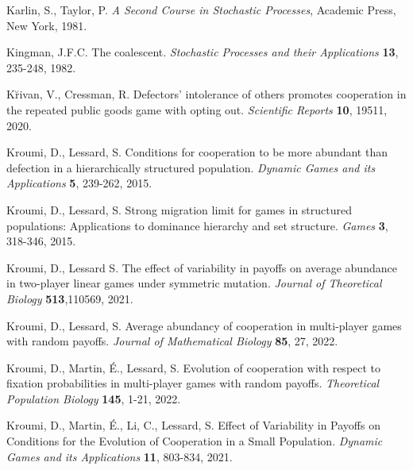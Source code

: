 \documentclass[11pt]{article}
\begin{document}
\begin{thebibliography}{99}
%
%
Karlin, S., Taylor, P. {\it A Second Course in Stochastic Processes}, Academic Press, New York, 1981.
%
%
%
%

Kingman, J.F.C.  The coalescent. {\it Stochastic Processes and their Applications} {\bf 13}, 235-248, 1982.

 K\u{r}ivan, V., Cressman, R. Defectors’ intolerance of others promotes cooperation in the
repeated public goods game with opting out.  {\it Scientific  Reports} {\bf 10}, 19511, 2020.


Kroumi, D., Lessard, S. Conditions for cooperation to be more abundant than defection in a hierarchically structured population. {\it Dynamic Games and its Applications } {\bf 5}, 239-262, 2015.

Kroumi, D., Lessard, S. Strong migration limit for games in structured populations: Applications to dominance hierarchy and set structure. {\it Games} {\bf 3}, 318-346, 2015.

Kroumi, D., Lessard S.
The effect of variability in payoffs on average abundance in two-player linear games under symmetric mutation.
{\it Journal of Theoretical Biology} {\bf 513},110569, 2021.

Kroumi, D., Lessard, S. Average abundancy of cooperation in multi-player games with random payoffs. {\it Journal of Mathematical Biology} {\bf 85}, 27, 2022.


Kroumi, D., Martin, \'E., Lessard, S. Evolution of cooperation with respect to fixation probabilities in multi-player games with random payoffs. {\it Theoretical Population Biology} {\bf 145}, 1-21, 2022.


Kroumi, D., Martin, \'E., Li, C., Lessard, S.  Effect of Variability in Payoffs on Conditions for the Evolution of Cooperation in a Small Population. {\it Dynamic Games and its Applications } {\bf 11}, 803-834, 2021.


\end{thebibliography}
\end{document}
